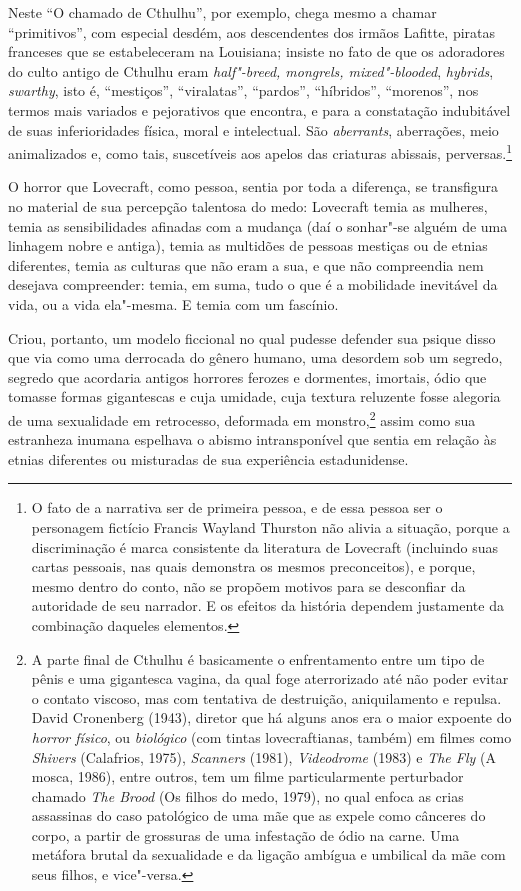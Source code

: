 Neste ``O chamado de Cthulhu'', por exemplo, chega mesmo a chamar
``primitivos'', com especial desdém, aos descendentes dos irmãos
Lafitte, piratas franceses que se estabeleceram na Louisiana; insiste no
fato de que os adoradores do culto antigo de Cthulhu eram
\emph{half"-breed, mongrels, mixed"-blooded}, \emph{hybrids},
\emph{swarthy}, isto é, ``mestiços'', ``viralatas'', ``pardos'',
``híbridos'', ``morenos'', nos termos mais variados e pejorativos que
encontra, e para a constatação indubitável de suas inferioridades
física, moral e intelectual. São \emph{aberrants}, aberrações, meio
animalizados e, como tais, suscetíveis aos apelos das criaturas
abissais, perversas.\footnote{O fato de a narrativa ser de primeira
  pessoa, e de essa pessoa ser o personagem fictício Francis Wayland
  Thurston não alivia a situação, porque a discriminação é marca
  consistente da literatura de Lovecraft (incluindo suas cartas
  pessoais, nas quais demonstra os mesmos preconceitos), e porque, mesmo
  dentro do conto, não se propõem motivos para se desconfiar da
  autoridade de seu narrador. E os efeitos da história dependem
  justamente da combinação daqueles elementos.}

O horror que Lovecraft, como pessoa, sentia por toda a diferença, se
transfigura no material de sua percepção talentosa do medo: Lovecraft
temia as mulheres, temia as sensibilidades afinadas com a mudança (daí o
sonhar"-se alguém de uma linhagem nobre e antiga), temia as multidões de
pessoas mestiças ou de etnias diferentes, temia as culturas que não eram
a sua, e que não compreendia nem desejava compreender: temia, em suma,
tudo o que é a mobilidade inevitável da vida, ou a vida ela"-mesma. E
temia com um fascínio.

Criou, portanto, um modelo ficcional no qual pudesse defender sua psique
disso que via como uma derrocada do gênero humano, uma desordem sob um
segredo, segredo que acordaria antigos horrores ferozes e dormentes,
imortais, ódio que tomasse formas gigantescas e cuja umidade, cuja
textura reluzente fosse alegoria de uma sexualidade em retrocesso,
deformada em monstro,\footnote{A parte final de Cthulhu é basicamente o
  enfrentamento entre um tipo de pênis e uma gigantesca vagina, da qual
  foge aterrorizado até não poder evitar o contato viscoso, mas com
  tentativa de destruição, aniquilamento e repulsa. David Cronenberg
  (1943), diretor que há alguns anos era o maior expoente do
  \emph{horror físico}, ou \emph{biológico} (com tintas lovecraftianas,
  também) em filmes como \emph{Shivers} (Calafrios, 1975),
  \emph{Scanners} (1981), \emph{Videodrome} (1983) e \emph{The Fly} (A
  mosca, 1986), entre outros, tem um filme particularmente perturbador
  chamado \emph{The Brood} (Os filhos do medo, 1979), no qual enfoca as
  crias assassinas do caso patológico de uma mãe que as expele como
  cânceres do corpo, a partir de grossuras de uma infestação de ódio na
  carne. Uma metáfora brutal da sexualidade e da ligação ambígua e
  umbilical da mãe com seus filhos, e vice"-versa.} assim como sua
estranheza inumana espelhava o abismo intransponível que sentia em
relação às etnias diferentes ou misturadas de sua experiência
estadunidense.

